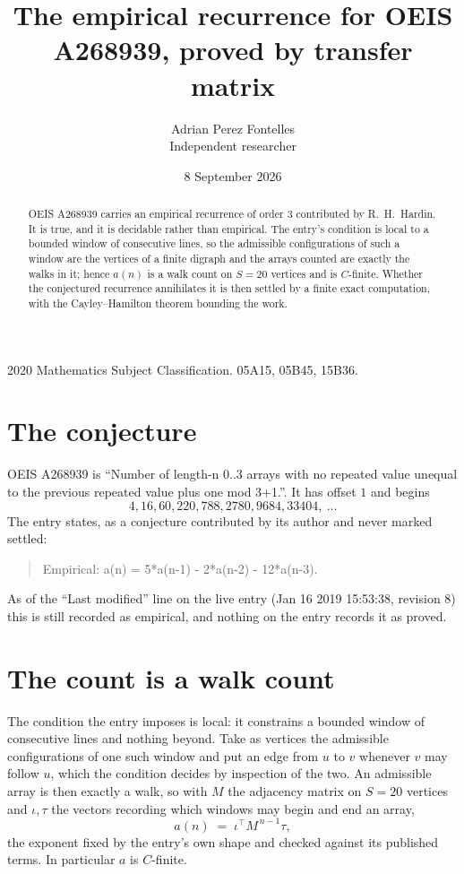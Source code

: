 \documentclass[11pt,a4paper]{article}
\title{The empirical recurrence for OEIS A268939, proved by transfer matrix}
\author{Adrian Perez Fontelles\\ \small Independent researcher}
\date{8 September 2026}
\theoremstyle{plain}
\theoremstyle{definition}
\begin{document}
\maketitle

\begin{abstract}
OEIS A268939 carries an empirical recurrence of order $3$ contributed by R.~H.~Hardin. It is
true, and it is decidable rather than empirical. The entry's condition is local to a bounded window of consecutive lines, so
the admissible configurations of such a window are the vertices of a finite digraph and the
arrays counted are exactly the walks in it; hence $a(n)$ is a walk count on $S=20$ vertices
and is $C$-finite. Whether the conjectured recurrence annihilates it is then settled by a
finite exact computation, with the Cayley--Hamilton theorem bounding the work.
\end{abstract}

\noindent\small 2020 Mathematics Subject Classification. 05A15, 05B45, 15B36.\normalsize

\section{The conjecture}

OEIS A268939 is ``Number of length-n 0..3 arrays with no repeated value unequal to the previous repeated value plus one mod 3+1.''. It has offset $1$ and begins
\[
4, 16, 60, 220, 788, 2780, 9684, 33404,\ \dots
\]
The entry states, as a conjecture contributed by its author and never marked settled:
\begin{quote}
Empirical: a(n) = 5*a(n-1) - 2*a(n-2) - 12*a(n-3).
\end{quote}
As of the ``Last modified'' line on the live entry (Jan 16 2019 15:53:38, revision 8) this is still
recorded as empirical, and nothing on the entry records it as proved.

\section{The count is a walk count}

The condition the entry imposes is local: it constrains a bounded window of consecutive lines and nothing beyond. Take as
vertices the admissible configurations of one such window and put an edge from $u$ to $v$
whenever $v$ may follow $u$, which the condition decides by inspection of the two. An
admissible array is then exactly a walk, so with $M$ the adjacency matrix on $S=20$ vertices
and $\iota,\tau$ the vectors recording which windows may begin and end an array,
\[
a(n)\;=\;\iota^{\!\top}M^{\,n-1}\tau ,
\]
the exponent fixed by the entry's own shape and checked against its published terms. In
particular $a$ is $C$-finite.
\end{document}
